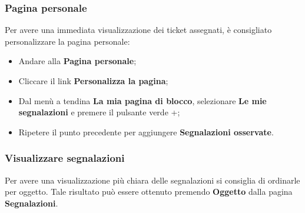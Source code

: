\subsubsection{Pagina personale}
 
	Per avere una immediata visualizzazione dei ticket assegnati, è consigliato personalizzare 
	la pagina personale: 
	\begin{itemize}
		\item Andare alla \textbf{Pagina personale}; 
		\item Cliccare il link \textbf{Personalizza la pagina}; 
		\item Dal menù a tendina \textbf{La mia pagina di blocco}, selezionare \textbf{Le mie segnalazioni} 
		e premere il pulsante verde +; 
		\item Ripetere il punto precedente per aggiungere \textbf{Segnalazioni osservate}. 
	
	\end{itemize}

	
\subsubsection{Visualizzare segnalazioni}

	Per avere una visualizzazione più chiara delle segnalazioni si consiglia di ordinarle per 
	oggetto. Tale risultato può essere ottenuto premendo \textbf{Oggetto} dalla pagina \textbf{Segnalazioni}.


